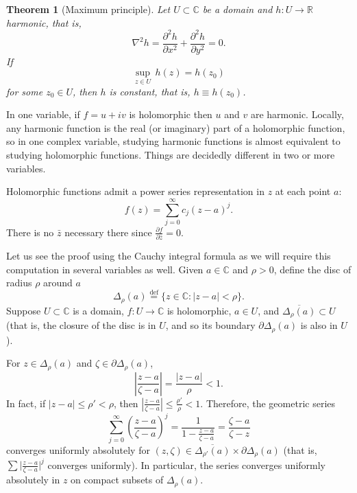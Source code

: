 \documentclass[12pt,openany]{book}
\newcommand{\sabs}[1]{\lvert {#1} \rvert}
\newcommand{\abs}[1]{\left\lvert {#1} \right\rvert}
\newcommand{\C}{{\mathbb{C}}}
\newcommand{\R}{{\mathbb{R}}}
\theoremstyle{plain}
\newtheorem{thm}{Theorem}[section]
\theoremstyle{remark}
\theoremstyle{definition}
\theoremstyle{exercise}
\theoremstyle{example}
\begin{document}
\begin{thm}[Maximum principle]
Let $U \subset \C$ be a domain and $h \colon U \to \R$
harmonic, that is,
%
\begin{equation*}
\nabla^2 h = \frac{\partial^2 h}{\partial x^2} + \frac{\partial^2 h}{\partial
y^2} = 0 .
\end{equation*}
If
\begin{equation*}
\sup_{z \in U} \, h(z) = h(z_0)
\end{equation*}
for some $z_0 \in U$, then $h$ is constant, that is, $h \equiv h(z_0)$.
\end{thm}

In one variable, if $f = u+iv$ is holomorphic then $u$ and $v$
are harmonic.  Locally, any harmonic function is
the real (or imaginary) part of a holomorphic function, so in
one complex variable, studying 
harmonic functions is almost equivalent to studying holomorphic
functions.  Things are decidedly different
in two or more variables.

\medskip

Holomorphic functions admit a power series representation in $z$
at each point $a$:
\begin{equation*}
f(z) = \sum_{j=0}^\infty c_j {(z-a)}^j .
\end{equation*}
There is no $\bar{z}$ necessary there
since $\frac{\partial f}{\partial \bar{z}} = 0$.

Let us see the proof using the Cauchy integral formula as we will
require this computation in several variables as well.
Given $a \in \C$ and $\rho > 0$, define the disc of radius $\rho$ around $a$
%
\begin{equation*}
\Delta_\rho(a)
\overset{\text{def}}{=}
\bigl\{ z \in \C : \sabs{z-a} < \rho \bigr\} .
\end{equation*}
Suppose $U \subset \C$ is a domain, $f \colon U \to \C$ is holomorphic,
$a \in U$, and $\overline{\Delta_\rho(a)} \subset U$ (that is, the closure
of the disc is in $U$, and so its boundary $\partial \Delta_\rho(a)$ is also in $U$).

For $z \in \Delta_\rho(a)$ and $\zeta \in \partial \Delta_\rho(a)$, 
\begin{equation*}
\abs{\frac{z-a}{\zeta-a}} =
\frac{\sabs{z-a}}{\rho} < 1 .
\end{equation*}
In fact, if $\sabs{z-a} \leq \rho' < \rho$, then
$\abs{\frac{z-a}{\zeta-a}} \leq \frac{\rho'}{\rho} < 1$.  Therefore,
the geometric series
\begin{equation*}
\sum_{j=0}^\infty
{\left(\frac{z-a}{\zeta-a}\right)}^j
=
\frac{1}{1-
\frac{z-a}{\zeta-a}}
=
\frac{\zeta-a}{\zeta-z}
\end{equation*}
converges uniformly absolutely for $(z,\zeta) \in \overline{\Delta_{\rho'}(a)}
\times \partial \Delta_\rho(a)$ (that is, $\sum {\bigl\lvert
\frac{z-a}{\zeta-a} \bigr\rvert}^j$
converges uniformly).  In particular, the
series converges uniformly absolutely in $z$ on compact subsets of $\Delta_{\rho}(a)$. 
\end{document}
